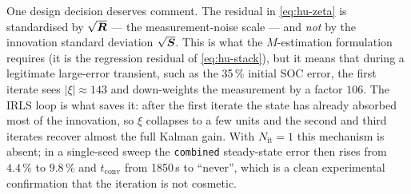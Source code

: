 One design decision deserves comment.  The residual in \eqref{eq:hu-zeta} is standardised by
$\sqrt{\bm{R}}$ --- the measurement-noise scale --- and \emph{not} by the innovation standard
deviation $\sqrt{\bm{S}}$.  This is what the $M$-estimation formulation requires (it is the
regression residual of \eqref{eq:hu-stack}), but it means that during a legitimate large-error
transient, such as the 35\,\% initial SOC error, the first iterate sees $|\xi|\approx143$ and
down-weights the measurement by a factor $106$.  The IRLS loop is what saves it: after the first
iterate the state has already absorbed most of the innovation, so $\xi$ collapses to a few units
and the second and third iterates recover almost the full Kalman gain.  With $N_{\mathrm{it}}=1$
this mechanism is absent; in a single-seed sweep the \texttt{combined} steady-state error then
rises from $4.4\,\%$ to $9.8\,\%$ and $t_\mathrm{conv}$ from 1850\,s to ``never'', which is a clean
experimental confirmation that the iteration is not cosmetic.

